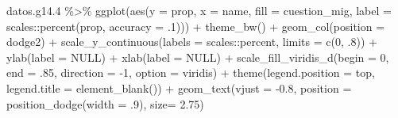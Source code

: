 \documentclass[
  12pt,
]{book}
\newenvironment{Shaded}{\begin{snugshade}}{\end{snugshade}}
\newcommand{\AttributeTok}[1]{\textcolor[rgb]{0.77,0.63,0.00}{#1}}
\newcommand{\ConstantTok}[1]{\textcolor[rgb]{0.00,0.00,0.00}{#1}}
\newcommand{\DecValTok}[1]{\textcolor[rgb]{0.00,0.00,0.81}{#1}}
\newcommand{\FloatTok}[1]{\textcolor[rgb]{0.00,0.00,0.81}{#1}}
\newcommand{\FunctionTok}[1]{\textcolor[rgb]{0.00,0.00,0.00}{#1}}
\newcommand{\NormalTok}[1]{#1}
\newcommand{\SpecialCharTok}[1]{\textcolor[rgb]{0.00,0.00,0.00}{#1}}
\newcommand{\StringTok}[1]{\textcolor[rgb]{0.31,0.60,0.02}{#1}}
\begin{document}
\begin{Shaded}
\begin{Highlighting}[]
\NormalTok{datos.g14}\FloatTok{.4} \SpecialCharTok{\%\textgreater{}\%} 
  \FunctionTok{ggplot}\NormalTok{(}\FunctionTok{aes}\NormalTok{(}\AttributeTok{y =}\NormalTok{ prop, }\AttributeTok{x =}\NormalTok{ name, }\AttributeTok{fill =}\NormalTok{ cuestion\_mig, }
             \AttributeTok{label =}\NormalTok{ scales}\SpecialCharTok{::}\FunctionTok{percent}\NormalTok{(prop, }\AttributeTok{accuracy =}\NormalTok{ .}\DecValTok{1}\NormalTok{))) }\SpecialCharTok{+} 
  \FunctionTok{theme\_bw}\NormalTok{() }\SpecialCharTok{+} 
  \FunctionTok{geom\_col}\NormalTok{(}\AttributeTok{position =} \StringTok{\textquotesingle{}dodge2\textquotesingle{}}\NormalTok{) }\SpecialCharTok{+}
  \FunctionTok{scale\_y\_continuous}\NormalTok{(}\AttributeTok{labels =}\NormalTok{ scales}\SpecialCharTok{::}\NormalTok{percent,}
                     \AttributeTok{limits =} \FunctionTok{c}\NormalTok{(}\DecValTok{0}\NormalTok{, .}\DecValTok{8}\NormalTok{)) }\SpecialCharTok{+}
  \FunctionTok{ylab}\NormalTok{(}\AttributeTok{label =} \ConstantTok{NULL}\NormalTok{) }\SpecialCharTok{+}
  \FunctionTok{xlab}\NormalTok{(}\AttributeTok{label =} \ConstantTok{NULL}\NormalTok{) }\SpecialCharTok{+}
  \FunctionTok{scale\_fill\_viridis\_d}\NormalTok{(}\AttributeTok{begin =} \DecValTok{0}\NormalTok{, }\AttributeTok{end =}\NormalTok{ .}\DecValTok{85}\NormalTok{, }\AttributeTok{direction =} \SpecialCharTok{{-}}\DecValTok{1}\NormalTok{, }\AttributeTok{option =} \StringTok{\textquotesingle{}viridis\textquotesingle{}}\NormalTok{) }\SpecialCharTok{+}
  \FunctionTok{theme}\NormalTok{(}\AttributeTok{legend.position =} \StringTok{\textquotesingle{}top\textquotesingle{}}\NormalTok{,}
        \AttributeTok{legend.title =} \FunctionTok{element\_blank}\NormalTok{()) }\SpecialCharTok{+}
  \FunctionTok{geom\_text}\NormalTok{(}\AttributeTok{vjust =} \SpecialCharTok{{-}}\FloatTok{0.8}\NormalTok{,}
            \AttributeTok{position =} \FunctionTok{position\_dodge}\NormalTok{(}\AttributeTok{width =}\NormalTok{ .}\DecValTok{9}\NormalTok{),}
            \AttributeTok{size=} \FloatTok{2.75}\NormalTok{)}
\end{Highlighting}
\end{Shaded}
\end{document}
